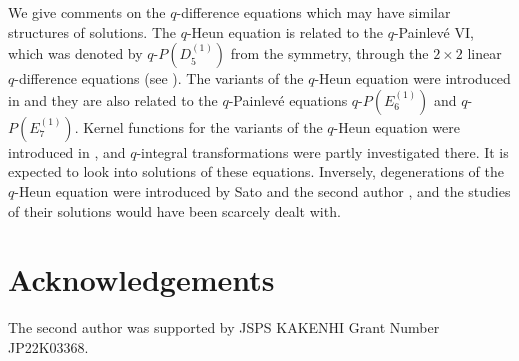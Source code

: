 \documentclass[12pt]{amsart}
\numberwithin{equation}{section}
\theoremstyle{definition}
\theoremstyle{remark}
\begin{document}
We give comments on the $q$-difference equations which may have similar structures of solutions.
The $q$-Heun equation is related to the $q$-Painlev\'e VI, which was denoted by $q$-$P(D^{(1)}_5)$ from the symmetry, through the $2\times 2$ linear $q$-difference equations (see \cite{TakR}). 
The variants of the $q$-Heun equation were introduced in \cite{TakqH} and they are also related to the $q$-Painlev\'e equations $q$-$P(E^{(1)}_6)$ and $q$-$P(E^{(1)}_7)$.
Kernel functions for the variants of the $q$-Heun equation were introduced in \cite{TakK}, and $q$-integral transformations were partly investigated there.
It is expected to look into solutions of these equations.
Inversely, degenerations of the $q$-Heun equation were introduced by Sato and the second author \cite{ST}, and the studies of their solutions would have been scarcely dealt with.


\section*{Acknowledgements}
The second author was supported by JSPS KAKENHI Grant Number JP22K03368.
\end{document}

